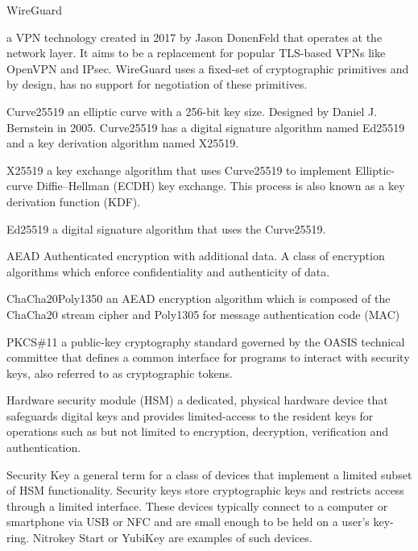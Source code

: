 \documentclass [11pt, proquest] {uwthesis}[2020/02/24]
\begin{document}
\begin{glossary}

\item[WireGuard]

a VPN technology created in 2017 by Jason DonenFeld that operates at the network layer. It aims to be a replacement for popular TLS-based VPNs like OpenVPN and IPsec. WireGuard uses a fixed-set of cryptographic primitives and by design, has no support for negotiation of these primitives. 

\item[Curve25519]
an elliptic curve with a 256-bit key size. Designed by Daniel J. Bernstein in 2005\cite{noauthor_curve25519_nodate}. 
Curve25519 has a digital signature algorithm named Ed25519 and a key derivation algorithm named X25519.

\item[X25519]
a key exchange algorithm that uses Curve25519 to implement Elliptic-curve Diffie–Hellman (ECDH) key exchange. This process is also known as a key derivation function (KDF).

\item[Ed25519] a digital signature algorithm that uses the Curve25519.

\item[AEAD]
Authenticated encryption with additional data. A class of encryption algorithms which enforce confidentiality and authenticity of data. 

\item[ChaCha20Poly1350]
an AEAD encryption algorithm which is composed of the ChaCha20 stream cipher and Poly1305 for message authentication code (MAC)

\item[PKCS\#11] a public-key cryptography standard governed by the OASIS technical committee\cite{noauthor_cryptsoft_nodate} that defines a common interface for programs to interact with security keys, also referred to as cryptographic tokens.

\item[Hardware security module]
(HSM) a dedicated, physical hardware device that safeguards digital keys and provides limited-access to the resident keys for operations such as but not limited to encryption, decryption, verification and authentication. 

\item[Security Key]
a general term for a class of devices that implement a limited subset of HSM functionality. Security keys store cryptographic keys and restricts access through a limited interface. These devices typically connect to a computer or smartphone via USB or NFC and are small enough to be held on a user's key-ring.
Nitrokey Start\cite{noauthor_nitrokey_nodate} or YubiKey\cite{noauthor_discover_nodate}\cite{noauthor_u2f_nodate-1} are examples of such devices.

\end{glossary}
\end{document}
